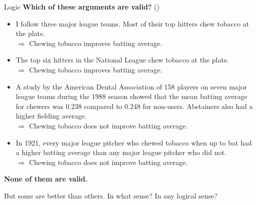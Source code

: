 \documentclass[8pt]{beamer}\usepackage[]{graphicx}\usepackage[]{color}
\begin{document}

\begin{frame}{Logic}
%
\textbf{Which of these arguments are valid?}
(\cite[Ch.1 Question 7]{hacking:2001:introduction})

%
\begin{itemize}
%
\item I follow three major league teams.  Most of their top hitters chew
tobacco at the plate.\\
$\Rightarrow$ Chewing tobacco improves batting average.
%
\item The top six hitters in the National League chew tobacco at the plate.\\
$\Rightarrow$ Chewing tobacco improves batting average.
%
\item A study by the American Dental Association of 158 players on
seven major league teams during the 1988 season showed that the mean batting
average for chewers was 0.238 compared to 0.248 for non-users.  Abstainers
also had a higher fielding average.\\
$\Rightarrow$ Chewing tobacco does not improve batting average.
%
\item In 1921, every major league pitcher who chewed tobacco when up to
bat had a higher batting average than any major league pitcher who did
not.\\
$\Rightarrow$ Chewing tobacco does not improve batting average.
%
\end{itemize}
%
\pause
\textbf{None of them are valid.}

But some are better than others.
In what sense?  In any logical sense?
%
\end{frame}


\end{document}
